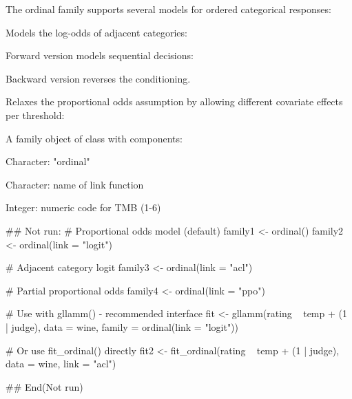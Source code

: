 \documentclass[a4paper]{book}
\begin{document}
\begin{Details}
The ordinal family supports several models for ordered categorical responses:



Models the log-odds of adjacent categories:

Forward version models sequential decisions:

Backward version reverses the conditioning.

Relaxes the proportional odds assumption by allowing different
covariate effects per threshold:
\end{Details}
%
\begin{Value}
A family object of class  with components:
\begin{ldescription}
\item[\code{family}] Character: "ordinal"
\item[\code{link}] Character: name of link function
\item[\code{link\_code}] Integer: numeric code for TMB (1-6)
\end{ldescription}
\end{Value}
%
\begin{Examples}
\begin{ExampleCode}
## Not run: 
# Proportional odds model (default)
family1 <- ordinal()
family2 <- ordinal(link = "logit")

# Adjacent category logit
family3 <- ordinal(link = "acl")

# Partial proportional odds
family4 <- ordinal(link = "ppo")

# Use with gllamm() - recommended interface
fit <- gllamm(rating ~ temp + (1 | judge),
              data = wine,
              family = ordinal(link = "logit"))

# Or use fit_ordinal() directly
fit2 <- fit_ordinal(rating ~ temp + (1 | judge),
                    data = wine,
                    link = "acl")

## End(Not run)

\end{ExampleCode}
\end{Examples}
\end{document}
